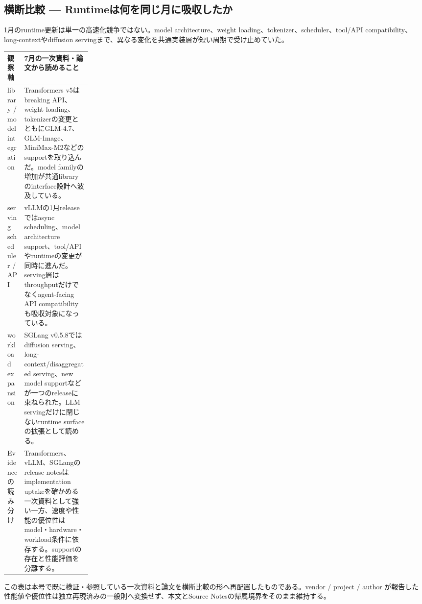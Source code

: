 \subsection*{横断比較 — Runtimeは何を同じ月に吸収したか}
1月のruntime更新は単一の高速化競争ではない。model architecture、weight loading、tokenizer、scheduler、tool/API compatibility、long-contextやdiffusion servingまで、異なる変化を共通実装層が短い周期で受け止めていた。
\medskip
\begin{center}
\small
\renewcommand{\arraystretch}{1.16}
\begin{tabularx}{\linewidth}{@{}p{0.20\linewidth}X@{}}
\toprule
観察軸 & 7月の一次資料・論文から読めること \\
\midrule
library / model integration & Transformers v5はbreaking API、weight loading、tokenizerの変更とともにGLM-4.7、GLM-Image、MiniMax-M2などのsupportを取り込んだ。model familyの増加が共通libraryのinterface設計へ波及している。 \cite{src-152188dd686e,src-9f7ae4228266} \\
serving scheduler / API & vLLMの1月releaseではasync scheduling、model architecture support、tool/APIやruntimeの変更が同時に進んだ。serving層はthroughputだけでなくagent-facing API compatibilityも吸収対象になっている。 \cite{src-3bc80a3c7870,src-d9f9de620203} \\
workload expansion & SGLang v0.5.8ではdiffusion serving、long-context/disaggregated serving、new model supportなどが一つのreleaseに束ねられた。LLM servingだけに閉じないruntime surfaceの拡張として読める。 \cite{src-6a97353d35a9} \\
Evidenceの読み分け & Transformers、vLLM、SGLangのrelease notesはimplementation uptakeを確かめる一次資料として強い一方、速度や性能の優位性はmodel・hardware・workload条件に依存する。supportの存在と性能評価を分離する。 \cite{src-152188dd686e,src-9f7ae4228266,src-3bc80a3c7870,src-d9f9de620203,src-6a97353d35a9} \\
\bottomrule
\end{tabularx}
\renewcommand{\arraystretch}{1.0}
\end{center}
\normalsize
\begin{claimboundary}[この比較の境界]
この表は本号で既に検証・参照している一次資料と論文を横断比較の形へ再配置したものである。vendor / project / author が報告した性能値や優位性は独立再現済みの一般則へ変換せず、本文とSource Notesの帰属境界をそのまま維持する。
\end{claimboundary}
